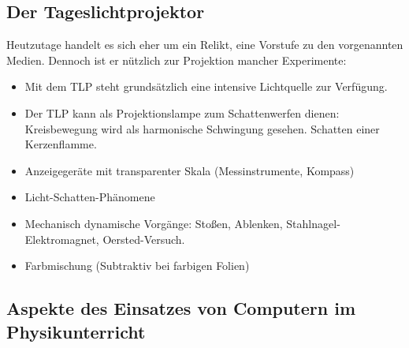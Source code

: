 \subsection{Der Tageslichtprojektor}
Heutzutage handelt es sich eher um ein Relikt, eine Vorstufe zu den vorgenannten Medien. Dennoch ist er nützlich zur Projektion mancher Experimente:

\begin{itemize}
	\item
	Mit dem TLP steht grunds\"{a}tzlich eine intensive
	Lichtquelle zur Verf\"{u}gung.
	\item
	Der TLP kann als Projektionslampe zum Schattenwerfen dienen:
	Kreisbewegung wird als harmonische Schwingung gesehen.
	Schatten einer Kerzenflamme.
	\item
	Anzeigeger\"{a}te mit transparenter Skala (Messinstrumente, Kompass)
	\item
	Licht-Schatten-Ph\"{a}nomene
	\item
	Mechanisch dynamische Vorg\"{a}nge: Sto{\ss}en, Ablenken,
	Stahlnagel-Elektromagnet, Oersted-Versuch.
	\item
	Farbmischung (Subtraktiv bei farbigen Folien)
\end{itemize}

\subsection{Aspekte des Einsatzes von Computern im Physikunterricht}

